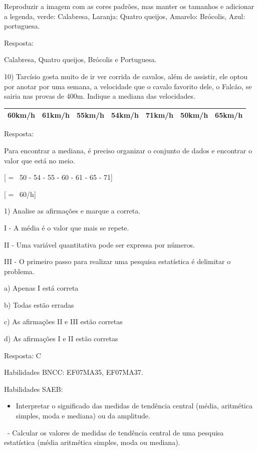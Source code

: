 Reproduzir a imagem com as cores padrões, mas manter os tamanhos e
adicionar a legenda, verde: Calabresa, Laranja: Quatro queijos, Amarelo:
Brócolis, Azul: portuguesa.

Resposta:

Calabresa, Quatro queijos, Brócolis e Portuguesa.

10) Tarcísio gosta muito de ir ver corrida de cavalos, além de assistir,
ele optou por anotar por uma semana, a velocidade que o cavalo favorito
dele, o Falcão, se sairia nas provas de 400m. Indique a mediana das
velocidades.

\begin{longtable}[]{@{}lllllll@{}}
\toprule
\endhead
60km/h & 61km/h & 55km/h & 54km/h & 71km/h & 50km/h &
65km/h\tabularnewline
\bottomrule
\end{longtable}

Resposta:

Para encontrar a mediana, é preciso organizar o conjunto de dados e
encontrar o valor que está no meio.

[ = \ 50 - 54 - 55 - 60 - 61 - 65 - 71]

[ = \ 60/h]


1) Analise as afirmações e marque a correta.

I - A média é o valor que mais se repete.

II - Uma variável quantitativa pode ser expressa por números.

III - O primeiro passo para realizar uma pesquisa estatística é
delimitar o problema.

a) Apenas I está correta

b) Todas estão erradas

c) As afirmações II e III estão corretas

d) As afirmações I e II estão corretas

Resposta: C

Habilidades BNCC: EF07MA35, EF07MA37.

Habilidades SAEB:

\begin{itemize}
\tightlist
\item
  Interpretar o significado das medidas de tendência central (média,
  aritmética simples, moda e mediana) ou da amplitude.
\end{itemize}

~- Calcular os valores de medidas de tendência central de uma pesquisa
estatística (média aritmética simples, moda ou mediana).

